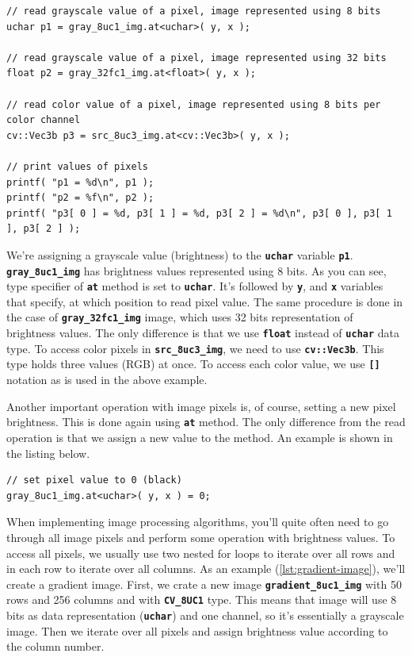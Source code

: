 \documentclass[10pt]{article}
\newcommand{\code}[1]{\textbf{\texttt{#1}}}
\newcommand{\tuchar}[0]{\code{uchar}}
\newcommand{\tfloat}{\code{float}}
\begin{document}
\begin{lstlisting}[style=CStyle,caption={Accessing pixels.},label={lst:pixel-access}]
// read grayscale value of a pixel, image represented using 8 bits
uchar p1 = gray_8uc1_img.at<uchar>( y, x );

// read grayscale value of a pixel, image represented using 32 bits
float p2 = gray_32fc1_img.at<float>( y, x );

// read color value of a pixel, image represented using 8 bits per color channel
cv::Vec3b p3 = src_8uc3_img.at<cv::Vec3b>( y, x );

// print values of pixels
printf( "p1 = %d\n", p1 );
printf( "p2 = %f\n", p2 );
printf( "p3[ 0 ] = %d, p3[ 1 ] = %d, p3[ 2 ] = %d\n", p3[ 0 ], p3[ 1 ], p3[ 2 ] );
\end{lstlisting}

We're assigning a grayscale value (brightness) to the \tuchar{} variable \code{p1}.
\code{gray\_8uc1\_img} has brightness values represented using 8 bits. As you can see, type specifier
of \code{at} method is set to \tuchar{}. It's followed by \code{y}, and \code{x} variables that specify,
at which position to read pixel value.
The same procedure is done in the case of \code{gray\_32fc1\_img} image, which uses 32 bits representation
of brightness values. The only difference is that we use \tfloat{} instead of \tuchar{} data type.
To access color pixels in \code{src\_8uc3\_img}, we need to use \code{cv::Vec3b}.
This type holds three values (RGB) at once. To access each color value, we use \code{[]} notation as is used
in the above example.

Another important operation with image pixels is, of course, setting a new pixel brightness.
This is done again using \code{at} method. The only difference from the read operation is that we assign
a new value to the method. An example is shown in the listing below.

\begin{lstlisting}[style=CStyle,caption={Assigning a new value to a pixel.},label={lst:pixel-assign}]
// set pixel value to 0 (black)
gray_8uc1_img.at<uchar>( y, x ) = 0;
\end{lstlisting}

When implementing image processing algorithms, you'll quite often need to go through all image pixels
and perform some operation with brightness values. To access all pixels, we usually use two nested for loops
to iterate over all rows and in each row to iterate over all columns. As an example (\ref{lst:gradient-image}),
we'll create a gradient image.
First, we crate a new image \code{gradient\_8uc1\_img} with 50 rows and 256 columns and with \code{CV\_8UC1} type.
This means that image will use 8 bits as data representation (\tuchar{}) and one channel, so it's essentially
a grayscale image. Then we iterate over all pixels and assign brightness value according to the column number.
\end{document}
